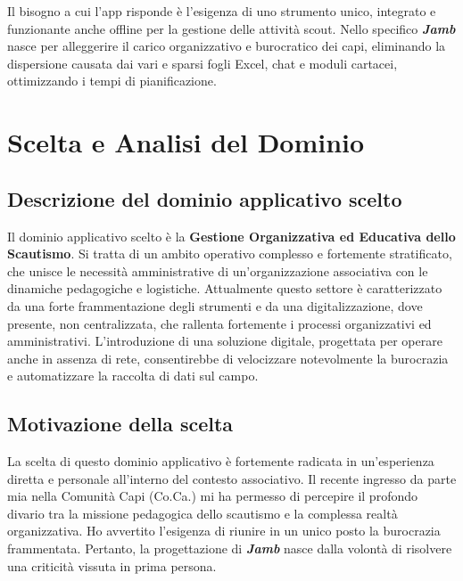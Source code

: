 \documentclass[11pt]{article}
\numberwithin{figure}{section}
\begin{document}
Il bisogno a cui l'app risponde è l'esigenza di uno strumento unico, integrato e funzionante anche offline per la gestione delle attività scout. Nello specifico \textit{\textbf{Jamb}} nasce per alleggerire il carico organizzativo e burocratico dei capi, eliminando la dispersione causata dai vari e sparsi fogli Excel, chat e moduli cartacei, ottimizzando i tempi di pianificazione.

\newpage

\section{Scelta e Analisi del Dominio}
\subsection{Descrizione del dominio applicativo scelto}
Il dominio applicativo scelto è la \textbf{Gestione Organizzativa ed Educativa dello Scautismo}. Si tratta di un ambito operativo complesso e fortemente stratificato, che unisce le necessità amministrative di un'organizzazione associativa con le dinamiche pedagogiche e logistiche. Attualmente questo settore è caratterizzato da una forte frammentazione degli strumenti e da una digitalizzazione, dove presente, non centralizzata, che rallenta fortemente i processi organizzativi ed amministrativi. L'introduzione di una soluzione digitale, progettata per operare anche in assenza di rete, consentirebbe di velocizzare notevolmente la burocrazia e automatizzare la raccolta di dati sul campo.

\subsection{Motivazione della scelta}
La scelta di questo dominio applicativo è fortemente radicata in un'esperienza diretta e personale all'interno del contesto associativo. Il recente ingresso da parte mia nella Comunità Capi (Co.Ca.) mi ha permesso di percepire il profondo divario tra la missione pedagogica dello scautismo e la complessa realtà organizzativa. Ho avvertito l'esigenza di riunire in un unico posto la burocrazia frammentata. Pertanto, la progettazione di \textit{\textbf{Jamb}} nasce dalla volontà di risolvere una criticità vissuta in prima persona.
\end{document}
